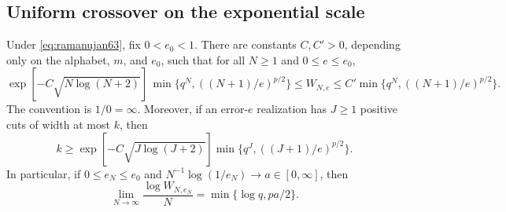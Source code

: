 \subsection{Uniform crossover on the exponential scale}
\begin{theorem}\label{thm:crossover63}
Under \eqref{eq:ramanujan63}, fix $0<e_0<1$. There are constants
$C,C'>0$, depending only on the alphabet, $m$, and $e_0$, such that
for all $N\ge1$ and $0\le e\le e_0$,
\begin{equation}\label{eq:crossover63}
 \exp[-C\sqrt{N\log(N+2)}]\,
 \min\{q^N,((N+1)/e)^{p/2}\}
 \le W_{N,e}\le
 C'\min\{q^N,((N+1)/e)^{p/2}\}.
\end{equation}
The convention is $1/0=\infty$.
Moreover, if an error-$e$ realization has $J\ge1$ positive cuts of
width at most $k$, then
\begin{equation}\label{eq:profilecrossover63}
 k\ge \exp[-C\sqrt{J\log(J+2)}]
          \min\{q^J,((J+1)/e)^{p/2}\}.
\end{equation}
In particular, if $0\le e_N\le e_0$ and
$N^{-1}\log(1/e_N)\to a\in[0,\infty]$, then
\begin{equation}\label{eq:rate63}
 \lim_{N\to\infty}\frac{\log W_{N,e_N}}N
                 =\min\{\log q,pa/2\}.
\end{equation}
\end{theorem}

